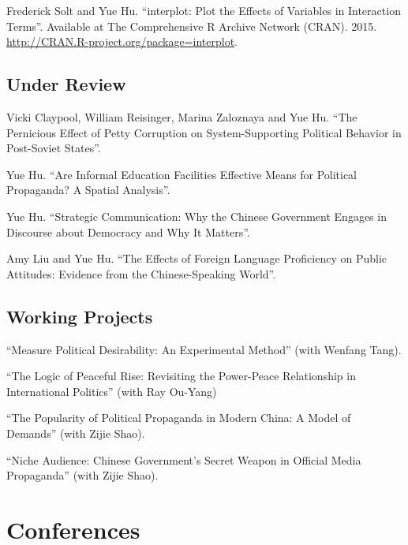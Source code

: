 \documentclass[10.5pt,]{article}
\begin{document}
Frederick Solt and Yue Hu. ``interplot: Plot the Effects of Variables in
Interaction Terms''. Available at The Comprehensive R Archive Network
(CRAN). 2015. \url{http://CRAN.R-project.org/package=interplot}.

\subsection{Under Review}\label{under-review}

Vicki Claypool, William Reisinger, Marina Zaloznaya and Yue Hu. ``The
Pernicious Effect of Petty Corruption on System-Supporting Political
Behavior in Post-Soviet States''.

Yue Hu. ``Are Informal Education Facilities Effective Means for
Political Propaganda? A Spatial Analysis''.

Yue Hu. ``Strategic Communication: Why the Chinese Government Engages in
Discourse about Democracy and Why It Matters''.

Amy Liu and Yue Hu. ``The Effects of Foreign Language Proficiency on
Public Attitudes: Evidence from the Chinese-Speaking World''.

\subsection{Working Projects}\label{working-projects}

``Measure Political Desirability: An Experimental Method'' (with Wenfang
Tang).

``The Logic of Peaceful Rise: Revisiting the Power-Peace Relationship in
International Politics'' (with Ray Ou-Yang)

``The Popularity of Political Propaganda in Modern China: A Model of
Demands'' (with Zijie Shao).

``Niche Audience: Chinese Government's Secret Weapon in Official Media
Propaganda'' (with Zijie Shao).

\section{Conferences}\label{conferences}
\end{document}
